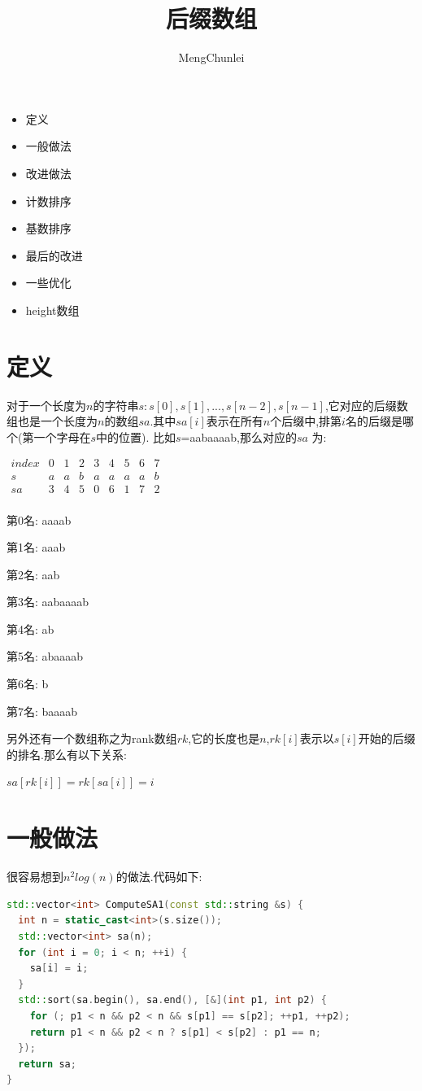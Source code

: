 \documentclass{article}
\title{后缀数组}
\author{MengChunlei}
\begin{document}
\maketitle
\begin{itemize}
	\item 定义
	\item 一般做法
	\item 改进做法
	\item 计数排序
	\item 基数排序
	\item 最后的改进
	\item 一些优化
	\item height数组
\end{itemize}
\section{定义}
对于一个长度为$n$的字符串$s:s[0],s[1],...,s[n-2],s[n-1]$,它对应的后缀数组也是一个长度为$n$的数组$sa$.其中$sa[i]$表示在所有$n$个后缀中,排第$i$名的后缀是哪个(第一个字母在$s$中的位置).
比如$s$=aabaaaab,那么对应的$sa$ 为: \par
$\begin{matrix} 
index & 0 & 1 & 2 & 3 & 4 & 5 & 6 & 7 \\ 
s & a & a & b & a & a & a & a & b \\ 
sa & 3 & 4 & 5 & 0 & 6 & 1 & 7 & 2 \\
\end{matrix}$ \par
第0名: aaaab\par
第1名: aaab\par
第2名: aab\par
第3名: aabaaaab\par
第4名: ab\par
第5名: abaaaab\par
第6名: b\par
第7名: baaaab\par
另外还有一个数组称之为rank数组$rk$,它的长度也是$n$,$rk[i]$表示以$s[i]$开始的后缀的排名.那么有以下关系: \par
$sa[rk[i]]=rk[sa[i]]=i$ \par
\section{一般做法}
很容易想到$n^{2}log(n)$的做法.代码如下: \par
\begin{lstlisting}[language=C++, caption={Normal}]
std::vector<int> ComputeSA1(const std::string &s) {
  int n = static_cast<int>(s.size());
  std::vector<int> sa(n);
  for (int i = 0; i < n; ++i) {
    sa[i] = i;
  }
  std::sort(sa.begin(), sa.end(), [&](int p1, int p2) {
    for (; p1 < n && p2 < n && s[p1] == s[p2]; ++p1, ++p2);
    return p1 < n && p2 < n ? s[p1] < s[p2] : p1 == n;
  });
  return sa;
}
\end{lstlisting}
\end{document}
